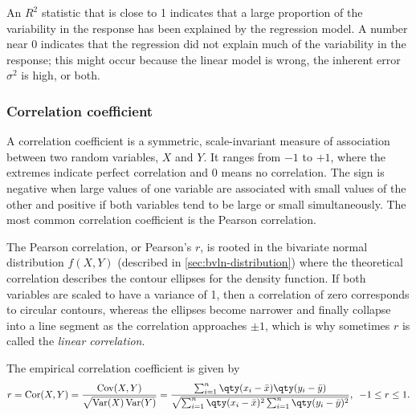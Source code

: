 An $R^{2}$ statistic that is close to 1 indicates that a large proportion of the variability in the response has been explained by the regression model. A number near 0 indicates that the regression did not explain much of the variability in the response; this might occur because the linear model is wrong, the inherent error $\sigma^{2}$ is high, or both.

\subsubsection{Correlation coefficient}
A correlation coefficient is a symmetric, scale-invariant measure of association between two random variables, $X$ and $Y$. It ranges from $-1$ to $+1$, where the extremes indicate perfect correlation and 0 means no correlation. The sign is negative when large values of one variable are associated with small values of the other and positive if both variables tend to be large or small simultaneously. The most common correlation coefficient is the Pearson correlation.

\bigskip
The Pearson correlation, or Pearson's $r$, is rooted in the bivariate normal distribution $f(X, Y)$ (described in \cref{sec:bvln-distribution})
where the theoretical correlation describes the contour ellipses for the density function. If both variables are scaled to have a variance of 1, then a correlation of zero corresponds to circular contours, whereas the ellipses become narrower and finally collapse into a line segment as the correlation approaches $\pm 1$, which is why sometimes $r$ is called the \emph{linear correlation}.

\bigskip
The empirical correlation coefficient is given by
\begin{align}
	r = \operatorname{Cor}(X,Y)
	  = \frac{\operatorname{Cov}(X,Y)}{\sqrt{\operatorname{Var}(X) \operatorname{Var}(Y) }}
	  =\frac{ \sum_{i=1}^{n} \qty(x_{i} - \bar{x}) \qty(y_{i} - \bar{y}) }{ \sqrt{\sum_{i=1}^{n} \qty(x_{i} - \bar{x})^{2} \sum_{i=1}^{n} \qty(y_{i} - \bar{y})^{2} } }
	  ,\,\,\,
	  -1 \le r \le 1.
\end{align}

